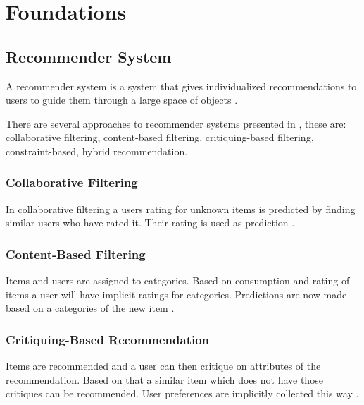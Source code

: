 \chapter{Foundations}
\label{ch:Foundations}


\section{Recommender System}
\label{sec:Foundations:RecommenderSystem}

A recommender system is a system that gives individualized recommendations to users to guide them through a large space of objects \cite[~ p. 331]{burkeHybridRecommenderSystems2002}.

There are several approaches to recommender systems presented in \cite{felfernigGroupRecommenderSystems2018}, these are: collaborative filtering, content-based filtering, critiquing-based filtering, constraint-based, hybrid recommendation.

\subsection{Collaborative Filtering}
In collaborative filtering a users rating for unknown items is predicted by finding similar users who have rated it. Their rating is used as prediction
\cite[~ pp. 7, 8]{felfernigDecisionTasksBasic2018}.

\subsection{Content-Based Filtering}
Items and users are assigned to categories. Based on consumption and rating of items a user will have implicit ratings for categories. Predictions are now made based on a categories of the new item \cite[~ pp. 10, 11]{felfernigDecisionTasksBasic2018}.

\subsection{Critiquing-Based Recommendation}
Items are recommended and a user can then critique on attributes of the recommendation. Based on that a similar item which does not have those critiques can be recommended. User preferences are implicitly collected this way \cite{knijnenburgEachHisOwn2011}.

